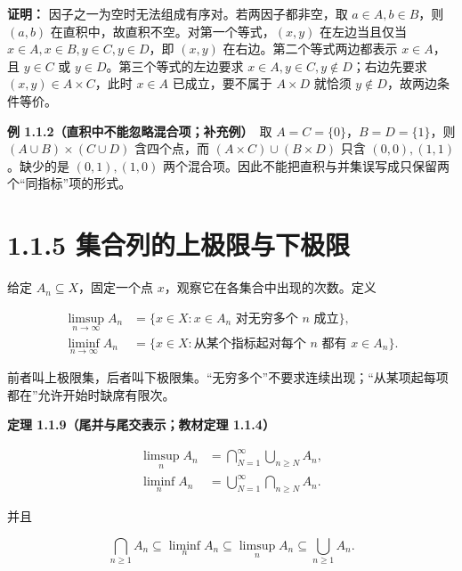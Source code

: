 \documentclass[11pt,a4paper]{article}
\begin{document}
\textbf{证明：} 因子之一为空时无法组成有序对。若两因子都非空，取
\(a\in A,b\in B\)，则 \((a,b)\)
在直积中，故直积不空。对第一个等式，\((x,y)\) 在左边当且仅当
\(x\in A,x\in B,y\in C,y\in D\)，即 \((x,y)\)
在右边。第二个等式两边都表示 \(x\in A\)，且 \(y\in C\) 或
\(y\in D\)。第三个等式的左边要求 \(x\in A,y\in C,y\notin D\)；右边先要求
\((x,y)\in A\times C\)，此时 \(x\in A\) 已成立，要不属于 \(A\times D\)
就恰须 \(y\notin D\)，故两边条件等价。

\textbf{例 1.1.2（直积中不能忽略混合项；补充例）}　取
\(A=C=\{0\}\)，\(B=D=\{1\}\)，则 \((A\cup B)\times(C\cup D)\)
含四个点，而 \((A\times C)\cup(B\times D)\) 只含
\((0,0),(1,1)\)。缺少的是 \((0,1),(1,0)\)
两个混合项。因此不能把直积与并集误写成只保留两个``同指标''项的形式。

\section[\S{}1.1.5
集合列的上极限与下极限]{1.1.5
集合列的上极限与下极限}\label{ux96c6ux5408ux5217ux7684ux4e0aux6781ux9650ux4e0eux4e0bux6781ux9650}

给定 \(A_n\subseteq X\)，固定一个点
\(x\)，观察它在各集合中出现的次数。定义

\begin{equation*}
\begin{aligned}
\limsup_{n\to\infty}A_n
 &=\{x\in X:x\in A_n\text{ 对无穷多个 }n\text{ 成立}\},\\
\liminf_{n\to\infty}A_n
 &=\{x\in X:\text{从某个指标起对每个 }n\text{ 都有 }x\in A_n\}.
\end{aligned}\tag{1.1.11}
\end{equation*}

前者叫上极限集，后者叫下极限集。``无穷多个''不要求连续出现；``从某项起每项都在''允许开始时缺席有限次。

\textbf{定理 1.1.9（尾并与尾交表示；教材定理 1.1.4）}

\begin{equation*}
\begin{aligned}
\limsup_n A_n&=\bigcap_{N=1}^{\infty}\bigcup_{n\ge N}A_n,\\
\liminf_n A_n&=\bigcup_{N=1}^{\infty}\bigcap_{n\ge N}A_n.
\end{aligned}\tag{1.1.12}
\end{equation*}

并且

\begin{equation*}
\bigcap_{n\ge1}A_n\subseteq\liminf_n A_n
\subseteq\limsup_n A_n\subseteq\bigcup_{n\ge1}A_n.
\tag{1.1.13}
\end{equation*}
\end{document}

